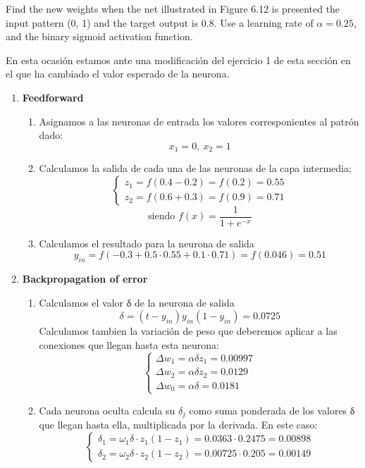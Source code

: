 \begin{problem}[3]
Find the new weights when the net illustrated in Figure 6.12 is presented the input pattern (0, 1) and the target output is 0.8. Use a learning rate of $α = 0.25$, and the binary sigmoid activation function.

\solution

En esta ocasión estamos ante una modificación del ejercicio 1 de esta sección en el que ha cambiado el valor esperado de la neurona.

\begin{enumerate}
\item \textbf{Feedforward}
\begin{enumerate}
\item Asignamos a las neuronas de entrada los valores corresponientes al patrón dado:
\[x_1 = 0, \ x_2 = 1\]
\item Calculamos la salida de cada una de las neuronas de la capa intermedia:
\[\left\{ \begin{array}{l}
z_1 = f(0.4 -0.2) = f(0.2) = 0.55 \\
z_2 = f(0.6+0.3) =f(0.9) = 0.71
\end{array}\right.\]
\[\text{siendo }f(x) = \frac{1}{1+e^{-x}} \]

\item Calculamos el resultado para la neurona de salida
\[y_{in} = f(-0.3+0.5\cdot 0.55 + 0.1 \cdot 0.71)=f(0.046) = 0.51\]
\end{enumerate}
\item \textbf{Backpropagation of error}
\begin{enumerate}
\item Calculamos el valor δ de la neurona de salida
\[δ = (t-y_{in})y_{in}(1-y_{in}) = 0.0725\]
Calculamos tambien la variación de peso que deberemos aplicar a las conexiones que llegan hasta esta neurona:
\[\left\{ \begin{array}{l}
Δw_1= αδz_1 = 0.00997 \\
Δw_2= αδz_2 = 0.0129 \\
Δw_0= αδ    = 0.0181
\end{array}\right.\]

\item Cada neurona oculta calcula su $δ_j$ como suma ponderada de los valores δ que llegan hasta ella, multiplicada por la derivada. En este caso:
\[\left\{ \begin{array}{l}
δ_1= ω_1 δ \cdot z_1(1-z_1)= 0.0363 \cdot 0.2475 = 0.00898\\
δ_2= ω_2 δ \cdot z_2(1-z_2)= 0.00725 \cdot 0.205 = 0.00149
\end{array}\right.\]


\end{enumerate}
\end{enumerate}
\end{problem}
